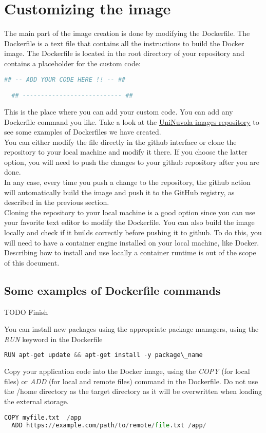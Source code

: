 \section{Customizing the image}\label{image_customization}
The main part of the image creation is done by modifying the Dockerfile. The
Dockerfile is a text file that contains all the instructions to build the
Docker image. The Dockerfile is located in the root directory of your
repository and contains a placeholder for the custom code:
\begin{lstlisting}[language=python]
  ## -- ADD YOUR CODE HERE !! -- ##

  ## --------------------------- ##
\end{lstlisting}
This is the place where you can add your custom code. You can add any
Dockerfile command you like. Take a look at the \href{https://github.com/UniNuvola/images}
{UniNuvola images repository} to see some examples of Dockerfiles we have
created. \\
You can either modify the file directly in the github interface or clone the
repository to your local machine and modify it there. If you choose the
latter option, you will need to push the changes to your github repository
after you are done. \\
In any case, every time you push a change to the repository, the github action will
automatically build the image and push it to the GitHub registry, as described in
the previous section. \\
Cloning the repository to your local machine is a good option since you 
can use your favorite text editor to modify the Dockerfile. You can also
build the image locally and check if it builds correctly before pushing it to
github. To do this, you will need to have a container engine installed on
your local machine, like Docker. \\
Describing how to install and use locally a container runtime is out of the scope of this document.

\subsection{Some examples of Dockerfile commands}

TODO Finish

You can install new packages using the appropriate package managers, using the
\textit{RUN} keyword in the Dockerfile

\begin{lstlisting}[language=python]
  RUN apt-get update && apt-get install -y package\_name
\end{lstlisting}

Copy your application code into the Docker image, using the \textit{COPY} (for
local files) or \textit{ADD} (for local and remote files) command in the
Dockerfile. Do not use the /home directory as the target directory as it will be
overwritten when loading the external storage.

\begin{lstlisting}[language=python]
  COPY myfile.txt  /app
  ADD https://example.com/path/to/remote/file.txt /app/
\end{lstlisting}
